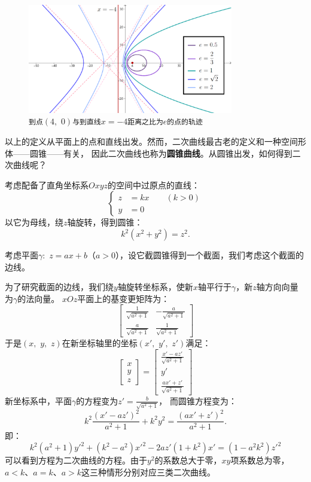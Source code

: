 \documentclass[12pt,UTF8]{ctexbook}
\theoremstyle{definition}
\theoremstyle{plain}
\begin{document}
\begin{figure}[h] 
    \centering
    \includegraphics[width=0.8\textwidth]{tu/二次曲线第二定义1.png}
    \caption*{\texttt{到点}$(4,\,\,0)$\texttt{与到直线}$x=-4$\texttt{距离之比为}$e$\texttt{的点的轨迹}}
\end{figure}
以上的定义从平面上的点和直线出发。然而，二次曲线最古老的定义和一种空间形体——圆锥——有关，
因此二次曲线也称为\textbf{圆锥曲线}。从圆锥出发，如何得到二次曲线呢？

考虑配备了直角坐标系$Oxyz$的空间中过原点的直线：
$$ 
\left\{
    \begin{array}{cl}
        z &= kx \qquad (k > 0) \\
        y &= 0
    \end{array}
\right.
$$
以它为母线，绕$z$轴旋转，得到圆锥：
$$ k^2(x^2 + y^2) = z^2. $$

考虑平面$\gamma: \,\,z = ax + b$（$a > 0$），设它截圆锥得到一个截面，我们考虑这个截面的边线。

为了研究截面的边线，我们绕$y$轴旋转坐标系，使新$x$轴平行于$\gamma$，新$z$轴方向向量为$\gamma$的法向量。
$xOz$平面上的基变更矩阵为：
$$
\begin{bmatrix}
    \frac{1}{\sqrt{a^2+1}} & -\frac{a}{\sqrt{a^2+1}} \\
    \frac{a}{\sqrt{a^2+1}} & \frac{1}{\sqrt{a^2+1}}
\end{bmatrix}
$$
于是$(x,\,\,y,\,\,z)$在新坐标轴里的坐标$(x',\,\,y',\,\,z')$满足：
$$
\begin{bmatrix}
    x \\ y \\ z
\end{bmatrix}
= 
\begin{bmatrix}
    \frac{x' - az'}{\sqrt{a^2+1}} \\ y' \\ \frac{ax' + z'}{\sqrt{a^2+1}}
\end{bmatrix}
$$
新坐标系中，平面$\gamma$的方程变为$z'=\frac{b}{\sqrt{a^2+1}}$，
而圆锥方程变为：
$$ k^2\frac{(x' - az')^2}{a^2+1} + k^2y^2 = \frac{(ax' + z')^2}{a^2+1} . $$
即：
$$ k^2(a^2+1)y'^2 + (k^2 - a^2)x'^2 - 2az'(1 + k^2)x' = (1 - a^2k^2)z'^2 $$
可以看到方程为二次曲线的方程。由于$y^2$的系数总大于零，$xy$项系数总为零，
$a<k$、$a=k$、$a>k$这三种情形分别对应三类二次曲线。
\end{document}
